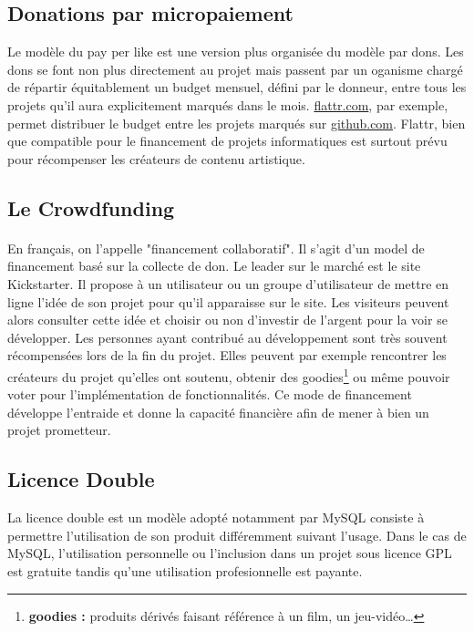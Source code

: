     \subsection{Donations par micropaiement}

Le modèle du pay per like est une version plus organisée du modèle par dons.
Les dons se font non plus directement au projet mais passent par un oganisme
chargé de répartir équitablement un budget mensuel, défini par le donneur,
entre tous les projets qu'il aura explicitement marqués dans le mois.
\url{flattr.com}, par exemple, permet distribuer le budget entre les projets
marqués sur \url{github.com}. Flattr, bien que compatible pour le financement
de projets informatiques est surtout prévu pour récompenser les créateurs de
contenu artistique.

    \subsection{Le Crowdfunding}

\paragraph{} En français, on l'appelle "financement collaboratif". Il s'agit
d'un model de financement basé sur la collecte de don. Le leader sur le marché
est le site Kickstarter. Il propose à un utilisateur ou un groupe d'utilisateur
de mettre en ligne l'idée de son projet pour qu'il apparaisse sur le site. Les
visiteurs peuvent alors consulter cette idée et choisir ou non d'investir de
l'argent pour la voir se développer. Les personnes ayant contribué au
développement sont très souvent récompensées lors de la fin du projet.
Elles peuvent
par exemple rencontrer les créateurs du projet qu'elles ont soutenu, obtenir des
goodies\footnote{\textbf{goodies :} produits dérivés faisant référence à un
film, un jeu-vidéo\ldots} ou même pouvoir voter pour l'implémentation de
fonctionnalités.  Ce mode de financement développe l'entraide et donne la
capacité financière afin de mener à bien un projet prometteur.

    \subsection{Licence Double}

La licence double est un modèle adopté notamment par MySQL consiste à permettre
l'utilisation de son produit différemment suivant l'usage. Dans le cas de
MySQL, l'utilisation personnelle ou l'inclusion dans un projet sous licence GPL
est gratuite tandis qu'une utilisation profesionnelle est payante.


